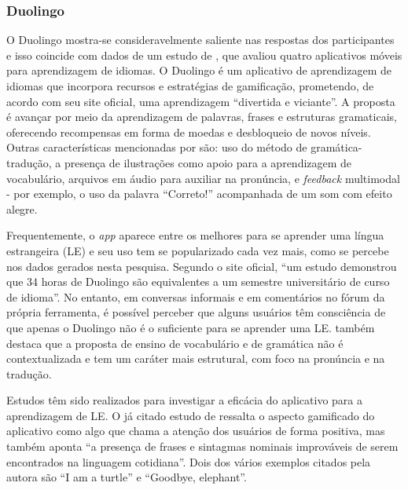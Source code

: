 \documentclass[portuguese]{textolivre}
\begin{document}
\subsubsection{Duolingo}\label{sec-organizacao}
O Duolingo mostra-se consideravelmente saliente nas respostas dos participantes e isso coincide com dados de um estudo de \textcite{paiva_aplicativos_2017}, que avaliou quatro aplicativos móveis para aprendizagem de idiomas. O Duolingo é um aplicativo de aprendizagem de idiomas que incorpora recursos e estratégias de gamificação, prometendo, de acordo com seu site oficial, uma aprendizagem “divertida e viciante”. A proposta é avançar por meio da aprendizagem de palavras, frases e estruturas gramaticais, oferecendo recompensas em forma de moedas e desbloqueio de novos níveis. Outras características mencionadas por \textcite{paiva_aplicativos_2017} são: uso do método de gramática-tradução, a presença de ilustrações como apoio para a aprendizagem de vocabulário, arquivos em áudio para auxiliar na pronúncia, e \textit{feedback} multimodal - por exemplo, o uso da palavra “Correto!” acompanhada de um som com efeito alegre.  

Frequentemente, o \textit{app} aparece entre os melhores para se aprender uma língua estrangeira (LE) e seu uso tem se popularizado cada vez mais, como se percebe nos dados gerados nesta pesquisa. Segundo o site oficial, “um estudo demonstrou que 34 horas de Duolingo são equivalentes a um semestre universitário de curso de idioma”. No entanto, em conversas informais e em comentários no fórum da própria ferramenta, é possível perceber que alguns usuários têm consciência de que apenas o Duolingo não é o suficiente para se aprender uma LE. \textcite{paiva_aplicativos_2017} também destaca que a proposta de ensino de vocabulário e de gramática não é contextualizada e tem um caráter mais estrutural, com foco na pronúncia e na tradução.

Estudos têm sido realizados para investigar a eficácia do aplicativo para a aprendizagem de LE. O já citado estudo de \textcite[p. 19]{paiva_aplicativos_2017} ressalta o aspecto gamificado do aplicativo como algo que chama a atenção dos usuários de forma positiva, mas também aponta “a presença de frases e sintagmas nominais improváveis de serem encontrados na linguagem cotidiana”. Dois dos vários exemplos citados pela autora são “I am a turtle” e “Goodbye, elephant”.
\end{document}
